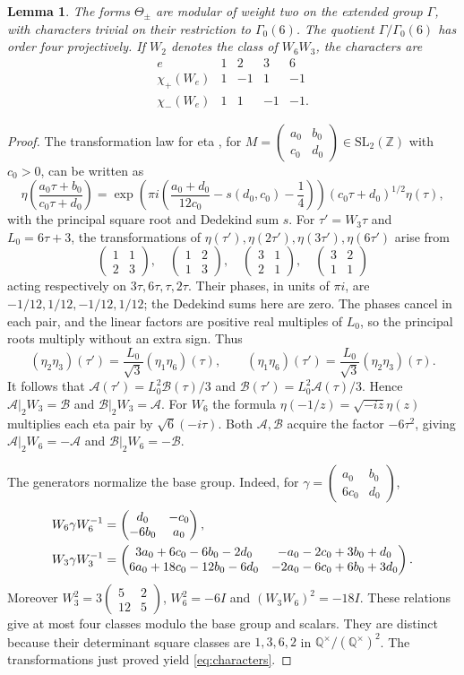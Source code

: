 \documentclass[11pt,a4paper]{article}
\newtheorem{lemma}[theorem]{Lemma}
\theoremstyle{remark}\newtheorem{remark}[theorem]{Remark}
\newcommand{\Z}{\mathbb Z}\newcommand{\Q}{\mathbb Q}
\newcommand{\A}{\mathcal A}\newcommand{\B}{\mathcal B}
\newcommand{\smat}[4]{\begin{pmatrix}#1&#2\\#3&#4\end{pmatrix}}
\begin{document}
\begin{lemma}\label{lem:character}
The forms $\Theta_\pm$ are modular of weight two on the extended group
$\Gamma$, with characters trivial on their restriction to $\Gamma_0(6)$.
The quotient $\Gamma/\Gamma_0(6)$ has order four projectively.
If $W_2$ denotes the class of $W_6W_3$, the characters are
\begin{equation}\label{eq:characters}
\begin{array}{c|rrrr}
 e&1&2&3&6\\\hline
 \chi_+(W_e)&1&-1&1&-1\\
 \chi_-(W_e)&1&1&-1&-1.
\end{array}
\end{equation}
\end{lemma}
\begin{proof}
The transformation law for eta
\cite[23.18.5--23.18.7]{dlmf}, for
$M=\left(\begin{smallmatrix}a_0&b_0\\c_0&d_0\end{smallmatrix}\right)
\in\mathrm{SL}_2(\Z)$ with $c_0>0$, can be written as
\[
 \eta\!\left(\frac{a_0\tau+b_0}{c_0\tau+d_0}\right)
 =\exp\!\left(\pi i\left(\frac{a_0+d_0}{12c_0}
          -s(d_0,c_0)-\frac14\right)\right)
 (c_0\tau+d_0)^{1/2}\eta(\tau),
\]
with the principal square root and Dedekind sum $s$.
For $\tau'=W_3\tau$ and $L_0=6\tau+3$, the transformations of
$\eta(\tau'),\eta(2\tau'),\eta(3\tau'),\eta(6\tau')$ arise from
\[
 \smat1123,\quad\smat1213,\quad\smat3121,\quad\smat3211
\]
acting respectively on $3\tau,6\tau,\tau,2\tau$.
Their phases, in units of $\pi i$, are
$-1/12,1/12,-1/12,1/12$; the Dedekind sums here are zero.
The phases cancel in each pair, and the linear factors are positive real
multiples of $L_0$, so the principal roots multiply without an extra sign.
Thus
\[
 (\eta_2\eta_3)(\tau')=\frac{L_0}{\sqrt3}(\eta_1\eta_6)(\tau),
 \qquad
 (\eta_1\eta_6)(\tau')=\frac{L_0}{\sqrt3}(\eta_2\eta_3)(\tau).
\]
It follows that $\A(\tau')=L_0^2\B(\tau)/3$ and
$\B(\tau')=L_0^2\A(\tau)/3$. Hence
$\A|_2W_3=\B$ and $\B|_2W_3=\A$.
For $W_6$ the formula $\eta(-1/z)=\sqrt{-iz}\eta(z)$ multiplies each
eta pair by $\sqrt6(-i\tau)$. Both $\A,\B$ acquire the factor
$-6\tau^2$, giving $\A|_2W_6=-\A$ and $\B|_2W_6=-\B$.

The generators normalize the base group. Indeed, for
$\gamma=\smat{a_0}{b_0}{6c_0}{d_0}$,
\begin{align}\label{eq:conjugations}
 W_6\gamma W_6^{-1}&=\smat{d_0}{-c_0}{-6b_0}{a_0},\notag\\
 W_3\gamma W_3^{-1}&=
 \begin{pmatrix}
 3a_0+6c_0-6b_0-2d_0&-a_0-2c_0+3b_0+d_0\\
 6a_0+18c_0-12b_0-6d_0&-2a_0-6c_0+6b_0+3d_0
 \end{pmatrix}.
\end{align}
Moreover
$W_3^2=3\smat5{2}{12}5$, $W_6^2=-6I$ and
$(W_3W_6)^2=-18I$. These relations give at most four classes modulo the
base group and scalars. They are distinct because their determinant square
classes are $1,3,6,2$ in $\Q^\times/(\Q^\times)^2$.
The transformations just proved yield \eqref{eq:characters}.
\end{proof}
\end{document}
